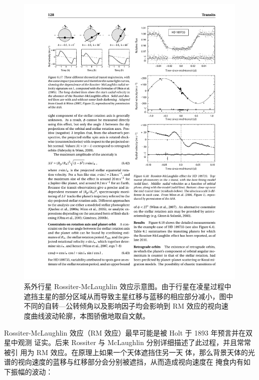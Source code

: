 \begin{figure}[b!]
\centering
\includegraphics[width=1.0\textwidth]{figures/chapter4/fig5_RMsim.pdf}
\caption[系外行星 Rossiter-McLaughlin 效应示意图。由于行星在凌星过程中遮挡主星的部分区域从而导致主星红移与蓝移的相应部分减小，图中不同的自转---公转倾角以及影响因子均会影响到 RM 效应的视向速度曲线波动轮廓，本图版权 Gaudi/Winn。]{系外行星 Rossiter-McLaughlin 效应示意图。由于行星在凌星过程中遮挡主星的部分区域从而导致主星红移与蓝移的相应部分减小，图中不同的自转---公转倾角以及影响因子均会影响到 RM 效应的视向速度曲线波动轮廓，本图骄傲地取自文献。}
\label{fig:rmsim}
\end{figure}

Rossiter-McLaughlin 效应（RM 效应）最早可能是被 Holt 于 1893 年预言并在双星中观测
证实\cite{Holt1893}。后来 Rossiter 与 McLaughlin 分别详细描述了此过程，并且常常被引
用为 RM 效应\cite{Rossiter1924,McLaughlin1924}。在原理上如果一个天体遮挡住另一天
体，那么背景天体的光谱的视向速度的蓝移与红移部分会分别被遮挡，从而造成视向速度在
掩食内有如下振幅的波动：

